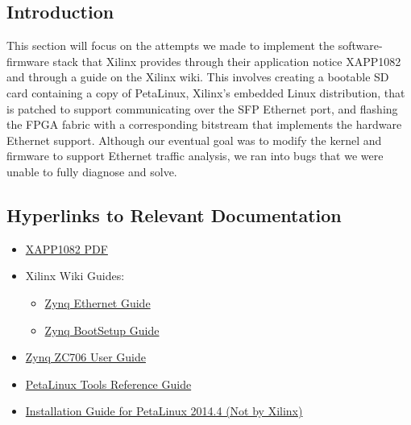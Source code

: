 \documentclass[12pt]{report}
\begin{document}
\subsection{Introduction}
This section will focus on the attempts we made to implement the software-firmware stack that Xilinx provides through their application notice XAPP1082 and through a guide on the Xilinx wiki. This involves creating a bootable SD card containing a copy of PetaLinux, Xilinx's embedded Linux distribution, that is patched to support communicating over the SFP Ethernet port, and flashing the FPGA fabric with a corresponding bitstream that implements the hardware Ethernet support. Although our eventual goal was to modify the kernel and firmware to support Ethernet traffic analysis, we ran into bugs that we were unable to fully diagnose and solve.
\subsection{Hyperlinks to Relevant Documentation}
\begin{itemize}
  \item \href{http://www.xilinx.com/support/documentation/application_notes/xapp1082-zynq-eth.pdf}{XAPP1082 PDF}
  \item Xilinx Wiki Guides:
    \begin{itemize}
    \item \href{http://www.wiki.xilinx.com/Zynq+PL+Ethernet}{Zynq Ethernet Guide}
    \item \href{http://www.wiki.xilinx.com/Prepare+Boot+Medium}{Zynq BootSetup Guide}
    \end{itemize}
  \item \href{http://www.xilinx.com/support/documentation/boards_and_kits/zc706/ug954-zc706-eval-board-xc7z045-ap-soc.pdf}{Zynq ZC706 User Guide}
  \item \href{http://www.xilinx.com/support/documentation/sw_manuals/petalinux2014_4/ug1144-petalinux-tools-reference-guide.pdf}{PetaLinux Tools Reference Guide}
  \item \href{http://www.syfer.com.au/assets/s502-00000-a.pdf}{Installation Guide for PetaLinux 2014.4 (Not by Xilinx)}
\end{itemize}
\end{document}
